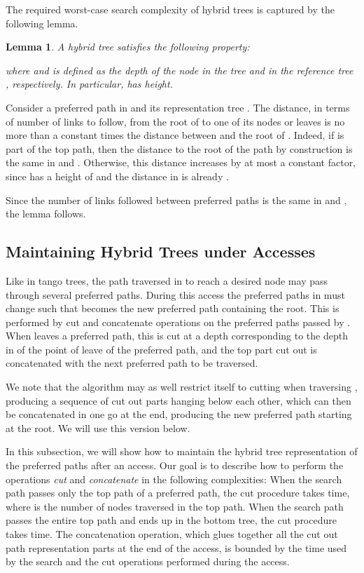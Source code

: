 \documentclass[letterpaper,11pt]{article}
\newtheorem{lemma}{Lemma}
\newenvironment{proof}{\noindent {\bf Proof:}}{{\hfill }}
\newcommand{\toppath}{top path}
\newcommand{\bottomtree}{bottom tree}
\newcounter{todo}
\newcommand{\todo}[1]{}
\begin{document}
The required worst-case search complexity of hybrid trees is captured by
the following lemma.
\begin{lemma}
\label{height}
A hybrid tree  satisfies the following property:
 
where  and  is defined as the depth of the node  in the
tree  and in the reference tree , respectively. In particular, 
has  height.
\end{lemma}
\begin{proof}
Consider a preferred path  in  and its representation tree . The
distance, in terms of number of links to follow, from the root of  to one
of its nodes or leaves  is no more than a constant times the distance
between  and the root of . Indeed, if  is part of the \toppath{},
then the distance to the root of the path by construction is the same in
 and . Otherwise, this distance increases by at most a constant
factor, since  has a height of  and the distance in 
is already .

Since the number of links followed between preferred paths is the same in
 and , the lemma follows. \todo{I (Rolf) here removed an argument I
didn't see the need for. Karim, please check.\\
(Karim) That's correct.}
\end{proof}

\subsection{Maintaining Hybrid Trees under Accesses}
\label{maintaining-hybrid-trees}

Like in tango trees, the path  traversed in  to reach a desired node
may pass through several preferred paths. During this access the preferred
paths in  must change such that  becomes the new preferred path
containing the root. This is performed by cut and concatenate operations on
the preferred paths passed by . When  leaves a preferred path, this
is cut at a depth corresponding to the depth in  of the point of leave
of the preferred path, and the top part cut out is concatenated with the
next preferred path to be traversed.

We note that the algorithm may as well restrict itself to cutting when
traversing , producing a sequence of cut out parts hanging below each
other, which can then be concatenated in one go at the end, producing the
new preferred path starting at the root. We will use this version below.

In this subsection, we will show how to maintain the hybrid tree
representation of the preferred paths after an access. Our goal is to
describe how to perform the operations \emph{cut} and \emph{concatenate} in
the following complexities: When the search path passes only the \toppath{}
of a preferred path, the cut procedure takes  time, where  is the
number of nodes traversed in the \toppath{}. When the search path passes
the entire \toppath{} and ends up in the \bottomtree{}, the cut procedure
takes  time.  The concatenation operation, which glues
together all the cut out path representation parts at the end of the
access, is bounded by the time used by the search and the cut operations
performed during the access.
\end{document}
